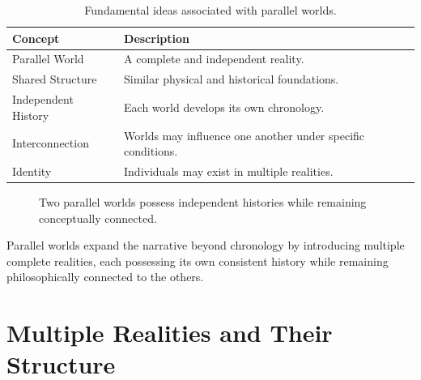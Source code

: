 \documentclass[12pt,oneside,openany]{book}
\begin{document}
\begin{table}[H]
\centering
\begin{tabular}{|p{4cm}|p{8cm}|}
\hline
\textbf{Concept} & \textbf{Description}\\
\hline
Parallel World & A complete and independent reality.\\
\hline
Shared Structure & Similar physical and historical foundations.\\
\hline
Independent History & Each world develops its own chronology.\\
\hline
Interconnection & Worlds may influence one another under specific conditions.\\
\hline
Identity & Individuals may exist in multiple realities.\\
\hline
\end{tabular}
\caption{Fundamental ideas associated with parallel worlds.}
\end{table}

\begin{figure}[H]
\centering
{}

\caption{Two parallel worlds possess independent histories while remaining conceptually connected.}
\end{figure}

\begin{tcolorbox}[colback=gray!8,colframe=black,title=Key Observation]
Parallel worlds expand the narrative beyond chronology by introducing multiple
complete realities, each possessing its own consistent history while remaining
philosophically connected to the others.
\end{tcolorbox}
\section{Multiple Realities and Their Structure}
\end{document}
